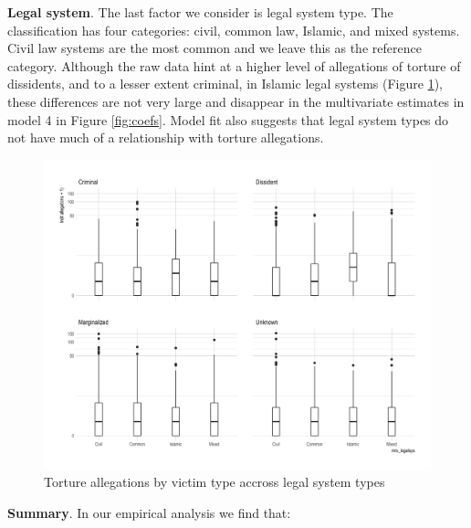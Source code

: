 \documentclass[12pt]{article}
\begin{document}
\textbf{Legal system}. The last factor we consider is legal system type. The \citet{mitchell2013domestic} classification has four categories: civil, common law, Islamic, and mixed systems. Civil law systems are the most common and we leave this as the reference category. Although the raw data hint at a higher level of allegations of torture of dissidents, and to a lesser extent criminal, in Islamic legal systems (Figure \ref{legal-system}), these differences are not very large and disappear in the multivariate estimates in model 4 in Figure \ref{fig:coefs}. Model fit also suggests that legal system types do not have much of a relationship with torture allegations. 

\begin{figure}
\begin{center}
\caption{Torture allegations by victim type accross legal system types}
\label{legal-system}
\includegraphics[width=.7\textwidth]{../output/boxplots-itt-allegations-v-legalsys.png}
\end{center}
\end{figure}

\textbf{Summary}. In our empirical analysis we find that:
\end{document}
